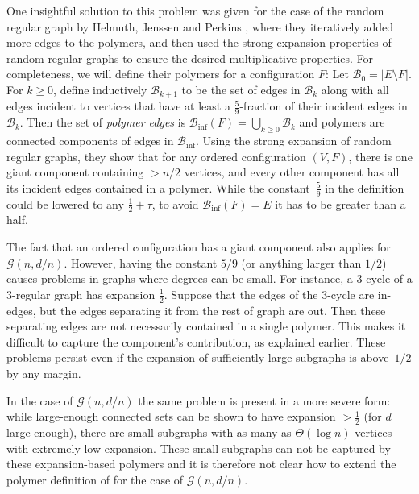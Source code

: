 \documentclass[11pt]{article}
\theoremstyle{plain}
\newcommand{\G}{\mathcal{G}}
\newcommand{\B}{\mathcal{B}}
\newcommand{\1}{\mathbb{1}}
\begin{document}
One insightful solution to this problem was given for the case of the random regular graph by Helmuth, Jenssen and Perkins \cite{RCM-Helmuth2020}, where they iteratively added more edges to the polymers, and then used the strong expansion properties of random regular graphs to ensure the desired multiplicative properties.  For completeness, we will define their polymers for a configuration $F$: 
Let \(\B_0 = |E\setminus F|\). For $k\geq 0$, define inductively \(\B_{k+1}\) to be the set of edges in \(\B_k\) along with all edges incident to vertices that have at least a \(\tfrac 59\)-fraction of their 
incident edges 
in \(\B_k\). Then the set of \textit{polymer edges} is \(\B_{\inf}(F)=\bigcup_{k\geq 0} \B_k\) and polymers are connected components of edges in \(\B_{\inf}\). Using the strong expansion of random regular graphs, they show that for any ordered configuration  \((V,F)\), there is one giant component containing \(>n/2\) vertices, and every other component has all its incident edges 
contained in a polymer. While the constant~\(\tfrac{5}{9}\) in the definition could be lowered to any \(\tfrac12 + \tau\), to avoid \(\B_{\inf}(F)= E\) it has to be greater than a half. 

The fact that an ordered configuration has a giant component also applies for $\G(n,d/n)$.  However, 
having the constant $5/9$ (or anything larger than $1/2$) causes problems in graphs where degrees can be small.  For instance,  a \(3\)-cycle of a \(3\)-regular graph has expansion $\tfrac{1}{2}$. Suppose that the edges of the $3$-cycle are in-edges, but the edges separating it from the rest of graph are out. 
Then these separating edges are not necessarily contained in a single polymer. This makes it difficult to capture the component's contribution, as explained earlier.
These problems persist even  if 
the  expansion of sufficiently large subgraphs 
is above~$1/2$ by any margin. 
 

In the case of \(\G(n,d/n)\) the same problem is present in a more severe form:  while  large-enough connected sets can be shown to have expansion \(>\tfrac 12\) (for \(d\) large enough), there are small subgraphs with as many as $\Theta(\log n)$ vertices with extremely low expansion. These small subgraphs can  not be captured by these expansion-based polymers and it is therefore not clear how to extend the polymer definition of \cite{RCM-Helmuth2020} for the case of \(\G(n,d/n)\).
\end{document}
